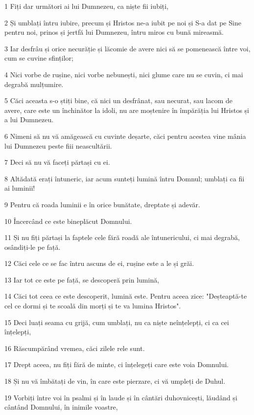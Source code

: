\par 1 Fiți dar următori ai lui Dumnezeu, ca niște fii iubiți,
\par 2 Și umblați întru iubire, precum și Hristos ne-a iubit pe noi și S-a dat pe Sine pentru noi, prinos și jertfă lui Dumnezeu, întru miros cu bună mireasmă.
\par 3 Iar desfrâu și orice necurăție și lăcomie de avere nici să se pomenească între voi, cum se cuvine sfinților;
\par 4 Nici vorbe de rușine, nici vorbe nebunești, nici glume care nu se cuvin, ci mai degrabă mulțumire.
\par 5 Căci aceasta s-o știți bine, că nici un desfrânat, sau necurat, sau lacom de avere, care este un închinător la idoli, nu are moștenire în împărăția lui Hristos și a lui Dumnezeu.
\par 6 Nimeni să nu vă amăgească cu cuvinte deșarte, căci pentru acestea vine mânia lui Dumnezeu peste fiii neascultării.
\par 7 Deci să nu vă faceți părtași cu ei.
\par 8 Altădată erați întuneric, iar acum sunteți lumină întru Domnul; umblați ca fii ai luminii!
\par 9 Pentru că roada luminii e în orice bunătate, dreptate și adevăr.
\par 10 Încercând ce este bineplăcut Domnului.
\par 11 Și nu fiți părtași la faptele cele fără roadă ale întunericului, ci mai degrabă, osândiți-le pe față.
\par 12 Căci cele ce se fac întru ascuns de ei, rușine este a le și grăi.
\par 13 Iar tot ce este pe față, se descoperă prin lumină,
\par 14 Căci tot ceea ce este descoperit, lumină este. Pentru aceea zice: "Deșteaptă-te cel ce dormi și te scoală din morți și te va lumina Hristos".
\par 15 Deci luați seama cu grijă, cum umblați, nu ca niște neînțelepți, ci ca cei înțelepți,
\par 16 Răscumpărând vremea, căci zilele rele sunt.
\par 17 Drept aceea, nu fiți fără de minte, ci înțelegeți care este voia Domnului.
\par 18 Și nu vă îmbătați de vin, în care este pierzare, ci vă umpleți de Duhul.
\par 19 Vorbiți între voi în psalmi și în laude și în cântări duhovnicești, lăudând și cântând Domnului, în inimile voastre,
